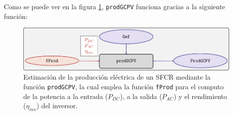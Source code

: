 Como se puede ver en la figura \ref{fig:prodgcpv}, \texttt{prodGCPV} funciona gracias a la siguiente función:
\begin{figure}[]
\centering
\includegraphics[keepaspectratio,width=\textwidth,height=\textheight]{figuras/prodgcpv.pdf}
\caption{Estimación de la producción eléctrica de un SFCR mediante la función \texttt{prodGCPV}, la cual emplea la función \texttt{fProd} para el computo de la potencia a la entrada (\(P_{DC}\)), a la salida (\(P_{AC}\)) y el rendimiento (\(\eta_{inv}\)) del inversor. \label{fig:prodgcpv}}
\end{figure}
